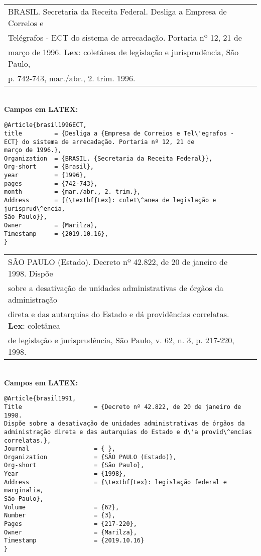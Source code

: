 \begin{tabular}{|l|c|} \hline
	BRASIL. Secretaria da Receita Federal. Desliga a Empresa de Correios e \\ Tel\'egrafos - ECT do sistema de arrecadação. Portaria nº 12, 21 de \\ março de 1996. \textbf{Lex}: colet\^anea de legislação e jurisprud\^encia, São Paulo,\\ p. 742-743,
	mar./abr., 2. trim. 1996. 
	\\\hline
\end{tabular} \\

\textbf{Campos em LATEX:} 


\begin{verbatim}
@Article{brasil1996ECT,
title         = {Desliga a {Empresa de Correios e Tel\'egrafos - 
ECT} do sistema de arrecadação. Portaria nº 12, 21 de
março de 1996.},
Organization  = {BRASIL. {Secretaria da Receita Federal}},
Org-short     = {Brasil},
year          = {1996},
pages         = {742-743},
month         = {mar./abr., 2. trim.},
Address       = {{\textbf{Lex}: colet\^anea de legislação e jurisprud\^encia, 
São Paulo}},
Owner         = {Marilza},
Timestamp     = {2019.10.16}, 
}
\end{verbatim}


\begin{tabular}{|l|c|} \hline
	SÃO PAULO (Estado). Decreto nº 42.822, de 20 de janeiro de 1998. Dispõe \\ sobre a desativação de unidades administrativas de órgãos da administração \\
	direta e das autarquias do Estado e d\'a provid\^encias correlatas. \textbf{Lex}: colet\^anea \\ de legislação e jurisprud\^encia, São Paulo, v. 62, n. 3, p. 217-220,
	1998.
	\\\hline
\end{tabular} \\

\textbf{Campos em LATEX:} 


\begin{verbatim}
@Article{brasil1991,
Title                    = {Decreto nº 42.822, de 20 de janeiro de 1998. 
Dispõe sobre a desativação de unidades administrativas de órgãos da 
administração direta e das autarquias do Estado e d\'a provid\^encias 
correlatas.},
Journal                  = { },
Organization             = {SÃO PAULO (Estado)},
Org-short                = {São Paulo},
Year                     = {1998},
Address                  = {\textbf{Lex}: legislação federal e marginalia, 
São Paulo},
Volume                   = {62},
Number                   = {3},
Pages                    = {217-220},
Owner                    = {Marilza},
Timestamp                = {2019.10.16}
}
\end{verbatim}
